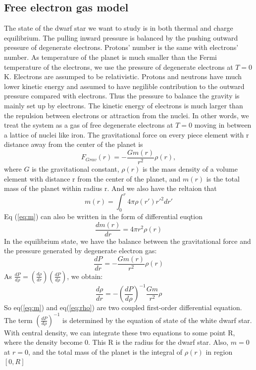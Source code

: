 \documentclass{article}
\begin{document}
\subsection{Free electron gas model}
The state of the dwarf star we want to study is in both thermal and charge equilibrium. The pulling inward pressure is balanced by the pushing outward pressure of degenerate electrons. Protons' number is the same with electrons' number. As temperature of the planet is much smaller than the Fermi temperature of the electrons, we use the pressure of degenerate electrons at $T=0$ K. Electrons are assumped to be relativistic. Protons and neutrons have much lower kinetic energy and assumed to have negilible contribution to the outward pressure compared with electrons. Thus the pressure to balance the gravity is mainly set up by electrons. The kinetic energy of electrons is much larger than the repulsion between electrons or attraction from the nuclei. In other words, we treat the system as a gas of free degenerate electrons at $T=0$ moving in between a lattice of nuclei like iron\cite{computational_dwarf_star}. 
The gravitational force on every piece element with r distance away from the center of the planet is 
\begin{equation}
F_{Grav}(r) = -\frac{Gm(r)}{r^2} \rho(r),
\end{equation}
where $G$ is the gravitational constant, $\rho(r)$ is the mass density of a volume element with distance r from the center of the planet, and $m(r)$ is the total mass of the planet within radius r. And we also have the reltaion that 
\begin{equation}
m(r)=\int_{0}^{r}4\pi \rho(r')r'^2 dr'
\label{eq:m}
\end{equation}
Eq (\ref{eq:m}) can also be written in the form of differential euqtion 
\begin{equation}
\frac{dm(r)}{dr}= 4\pi r^2 \rho(r)
\end{equation}
In the equilibrium state, we have the balance between the gravitational force and the pressure generated by degenerate electron gas:
\begin{equation}
\frac{dP}{dr} = -\frac{Gm(r)}{r^2}\rho(r)
\end{equation}
As $\frac{dP}{d\rho} =(\frac{d\rho}{dr})(\frac{dP}{d\rho})$, we obtain:
\begin{equation}
\frac{d\rho}{dr} = - (\frac{dP}{d\rho})^{-1}\frac{Gm}{r^2}\rho
\label{eq:rho}
\end{equation}
So eq(\ref{eq:m}) and eq(\ref{eq:rho}) are two coupled first-order differential equation. The term $(\frac{dP}{d\rho})^{-1}$ is determined by the equation of state of the white dwarf star. With central density, we can integrate these two equations to some point R, where the density become 0. This R is the radius for the dwarf star. Also, $m=0$ at $r=0$, and the total mass of the planet is the integral of $\rho(r)$ in region $[0,R]$
\end{document}
